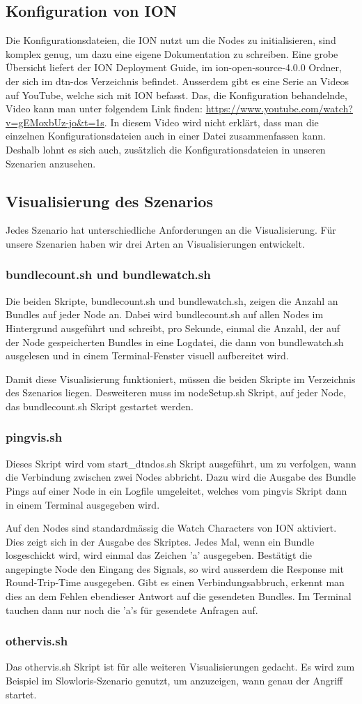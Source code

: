 \documentclass{article}
\begin{document}
\subsection{Konfiguration von ION}
Die Konfigurationsdateien, die ION nutzt um die Nodes zu initialisieren, sind komplex genug, um dazu eine eigene Dokumentation zu schreiben. Eine grobe Übersicht liefert der ION Deployment Guide, im ion-open-source-4.0.0 Ordner, der sich im dtn-dos Verzeichnis befindet. Ausserdem gibt es eine Serie an Videos auf YouTube, welche sich mit ION befasst. Das, die Konfiguration behandelnde, Video kann man unter folgendem Link finden: \url{https://www.youtube.com/watch?v=gEMoxbUz-jo&t=1s}. In diesem Video wird nicht erklärt, dass man die einzelnen Konfigurationsdateien auch in einer Datei zusammenfassen kann. Deshalb lohnt es sich auch, zusätzlich die Konfigurationsdateien in unseren Szenarien anzusehen.  
\subsection{Visualisierung des Szenarios}
Jedes Szenario hat unterschiedliche Anforderungen an die Visualisierung. Für unsere Szenarien haben wir drei Arten an Visualisierungen entwickelt. 
\subsubsection{bundlecount.sh und bundlewatch.sh}
Die beiden Skripte, bundlecount.sh und bundlewatch.sh, zeigen die Anzahl an Bundles auf jeder Node an. Dabei wird bundlecount.sh auf allen Nodes im Hintergrund ausgeführt und schreibt, pro Sekunde, einmal die Anzahl, der auf der Node gespeicherten Bundles in eine Logdatei, die dann von bundlewatch.sh ausgelesen und in einem Terminal-Fenster visuell aufbereitet wird.\par
Damit diese Visualisierung funktioniert, müssen die beiden Skripte im Verzeichnis des Szenarios liegen. Desweiteren muss im nodeSetup.sh Skript, auf jeder Node, das bundlecount.sh Skript gestartet werden.
\subsubsection{pingvis.sh}
Dieses Skript wird vom start\_dtndos.sh Skript ausgeführt, um zu verfolgen, wann die Verbindung zwischen zwei Nodes abbricht. Dazu wird die Ausgabe des Bundle Pings auf einer Node in ein Logfile umgeleitet, welches vom pingvis Skript dann in einem Terminal ausgegeben wird.\par
Auf den Nodes sind standardmässig die Watch Characters von ION aktiviert. Dies zeigt sich in der Ausgabe des Skriptes. Jedes Mal, wenn ein Bundle losgeschickt wird, wird einmal das Zeichen 'a' ausgegeben. Bestätigt die angepingte Node den Eingang des Signals, so wird ausserdem die Response mit  Round-Trip-Time ausgegeben. Gibt es einen Verbindungsabbruch, erkennt man dies an dem Fehlen ebendieser Antwort auf die gesendeten Bundles. Im Terminal tauchen dann nur noch die 'a's für gesendete Anfragen auf. 
\subsubsection{othervis.sh}
Das othervis.sh Skript ist für alle weiteren Visualisierungen gedacht. Es wird zum Beispiel im Slowloris-Szenario genutzt, um anzuzeigen, wann genau der Angriff startet. 
\newpage
\printbibliography
\end{document}
